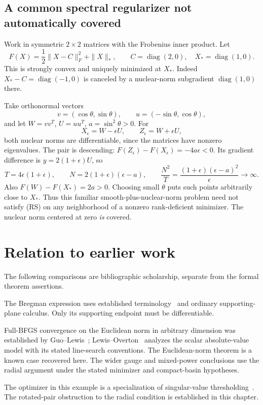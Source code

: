 

\subsection{A common spectral regularizer not automatically covered}

Work in symmetric $2\times2$ matrices with the Frobenius inner product. Let
\[
 F(X)=\frac12\|X-C\|_F^2+\|X\|_*,\qquad
 C=\operatorname{diag}(2,0),\quad X_*=\operatorname{diag}(1,0).
\]
This is strongly convex and uniquely minimized at $X_*$. Indeed $X_*-C=\operatorname{diag}(-1,0)$ is canceled by a nuclear-norm subgradient $\operatorname{diag}(1,0)$ there.

Take orthonormal vectors
\[
 v=(\cos\theta,\sin\theta),\qquad u=(-\sin\theta,\cos\theta),
\]
and let $W=vv^T$, $U=uu^T$, $a=\sin^2\theta>0$. For
\[
 X_\epsilon=W-\epsilon U,\qquad Z_\epsilon=W+\epsilon U,
\]
both nuclear norms are differentiable, since the matrices have nonzero eigenvalues. The pair is descending: $F(Z_\epsilon)-F(X_\epsilon)=-4a\epsilon<0$. Its gradient difference is $y=2(1+\epsilon)U$, so
\[
 T=4\epsilon(1+\epsilon),\qquad
 N=2(1+\epsilon)(\epsilon-a),\qquad
 \frac{N^2}{T}=\frac{(1+\epsilon)(\epsilon-a)^2}{\epsilon}\to\infty.
\]
Also $F(W)-F(X_*)=2a>0$. Choosing small $\theta$ puts such points arbitrarily close to $X_*$. Thus this familiar smooth-plus-nuclear-norm problem need not satisfy (RS) on any neighborhood of a nonzero rank-deficient minimizer. The nuclear norm centered at zero \emph{is} covered.


\endgroup


\section*{Relation to earlier work}
The following comparisons are bibliographic scholarship, separate from the formal theorem assertions.

The Bregman expression uses established terminology~\cite[Definition~1]{BB} and ordinary supporting-plane calculus. Only its supporting endpoint must be differentiable.

Full-BFGS convergence on the Euclidean norm in arbitrary dimension was established by Guo--Lewis~\cite[Corollary~4.2]{GL18}; Lewis--Overton~\cite[Section~5.1]{LO} analyzes the scalar absolute-value model with its stated line-search conventions. The Euclidean-norm theorem is a known case recovered here. The wider gauge and mixed-power conclusions use the radial argument under the stated minimizer and compact-basin hypotheses.

The optimizer in this example is a specialization of singular-value thresholding~\cite[Theorem~2.1]{CCS10}. The rotated-pair obstruction to the radial condition is established in this chapter.
